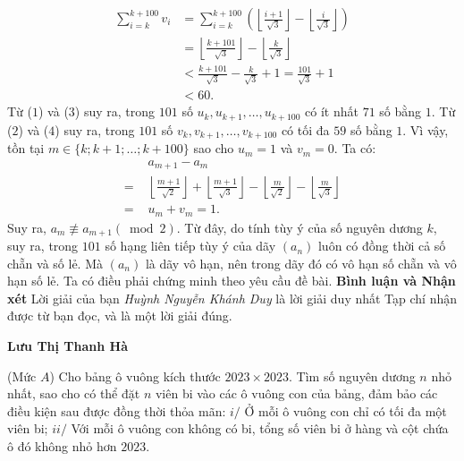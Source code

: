 \begin{multicols}{2}
\begin{align*}
		\sum\limits_{i = k}^{k + 100} {{v_i}}  &= \sum\limits_{i = k}^{k + 100} {\left( {\left\lfloor {\frac{{i + 1}}{{\sqrt 3 }}} \right\rfloor  - \left\lfloor {\frac{i}{{\sqrt 3 }}} \right\rfloor } \right)}  \\
		&= \left\lfloor {\frac{{k + 101}}{{\sqrt 3 }}} \right\rfloor  - \left\lfloor {\frac{k}{{\sqrt 3 }}} \right\rfloor \\
		& < \frac{{k + 101}}{{\sqrt 3 }} - \frac{k}{{\sqrt 3 }} + 1 = \frac{{101}}{{\sqrt 3 }} + 1\\
		& < 60. \tag{$4$}
	\end{align*}
	Từ ($1$) và ($3$) suy ra, trong $101$ số ${u_k},{u_{k + 1}}, \ldots ,{u_{k + 100}}$  có ít nhất $71$ số bằng $1$.
	\vskip 0.05cm
	Từ ($2$) và ($4$) suy ra, trong $101$ số ${v_k},{v_{k + 1}}, \ldots ,{v_{k + 100}}$  có tối đa $59$ số bằng $1$.
	\vskip 0.05cm
	Vì vậy, tồn tại $m \in \{k; k + 1; \ldots; k + 100\}$ sao cho $u_m = 1$  và $v_m = 0$.
	\vskip 0.05cm 
	Ta có:
	\begin{align*}
		&{a_{m + 1}} - {a_m}\\
		= &\left\lfloor {\frac{{m + 1}}{{\sqrt 2 }}} \right\rfloor  + \left\lfloor {\frac{{m + 1}}{{\sqrt 3 }}} \right\rfloor  - \left\lfloor {\frac{m}{{\sqrt 2 }}} \right\rfloor  - \left\lfloor {\frac{m}{{\sqrt 3 }}} \right\rfloor  \\
		= \,\,&{u_m} + {v_m} = 1.
	\end{align*}
	Suy ra, ${a_m}\not  \equiv {a_{m + 1}}\left( {\bmod 2} \right).$  Từ đây, do tính tùy ý của số nguyên dương $k$, suy ra, trong $101$ số hạng liên tiếp tùy ý của dãy $\left(a_n\right)$  luôn có đồng thời cả số chẵn và số lẻ. Mà $\left(a_n\right)$  là dãy vô hạn, nên trong dãy đó có vô hạn số chẵn và vô hạn số lẻ. Ta có điều phải chứng minh theo yêu cầu đề bài.
	\vskip 0.05cm
	\textbf{\color{thachthuctoanhoc}Bình luận và Nhận xét}
	\vskip 0.05cm
	Lời giải của bạn \textit{Huỳnh Nguyễn Khánh Duy} là lời giải duy nhất Tạp chí nhận được từ bạn đọc, và là một lời giải đúng.
	\begin{flushright}
		\textbf{\color{thachthuctoanhoc}Lưu Thị Thanh Hà}
	\end{flushright}
	{}
	(Mức $A$) Cho bảng ô vuông kích thước $2023 \times 2023$. Tìm số nguyên dương $n$ nhỏ nhất, sao cho có thể đặt $n$ viên bi vào các ô vuông con của bảng, đảm bảo các điều kiện sau được đồng thời thỏa mãn:
	\vskip 0.05cm
	$i/$ Ở mỗi ô vuông con chỉ có tối đa một viên bi;
	\vskip 0.05cm
	$ii/$ Với mỗi ô vuông con không có bi, tổng số viên bi ở hàng và cột chứa ô đó không nhỏ hơn $2023$.

\end{multicols}
